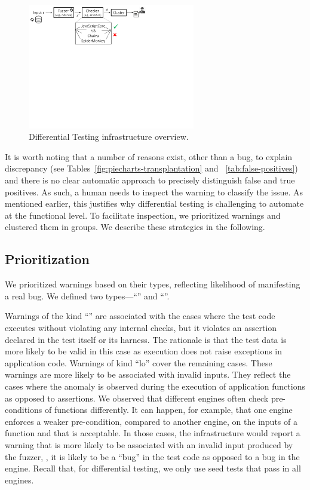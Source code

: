 \documentclass[sigconf,review, anonymous]{acmart}
\begin{document}
\begin{figure}[t]
  \centering
  \includegraphics[trim=0 350 0 0,clip,width=0.65\textwidth]{diff-testing-runtimes}
  \caption{\label{fig:workflow}Differential Testing infrastructure overview.}
\end{figure}


It is worth noting that a number of reasons exist, other than a bug,
to explain discrepancy (see Tables~\ref{fig:piecharts-transplantation}
and ~\ref{tab:false-positives}) and there is no clear automatic
approach to precisely distinguish false and true positives. As such, a
human needs to inspect the warning to classify the issue. As mentioned
earlier, this justifies why differential testing is challenging to
automate at the functional level. To facilitate inspection, we
prioritized warnings and clustered them in groups. We describe these
strategies in the following.

\subsection{Prioritization}

We prioritized warnings based on their types, reflecting likelihood of
manifesting a real bug. We defined two types---``\hi{}'' and
``\lo{}''.

Warnings of the kind ``\hi{}'' are associated with the cases where the
test code executes without violating any internal checks, but it
violates an assertion declared in the test itself or its harness. The
rationale is that the test data is more likely to be valid in this
case as execution does not raise exceptions in application
code. Warnings of kind ``lo'' cover the remaining cases. These
warnings are more likely to be associated with invalid inputs. They
reflect the cases where the anomaly is observed during the execution
of application functions as opposed to assertions. We observed that
different engines often check pre-conditions of functions
differently. It can happen, for example, that one engine enforces a
weaker pre-condition, compared to another engine, on the inputs of a
function and that is acceptable. In those cases,
the infrastructure would report a warning that is more likely to be
associated with an invalid input produced by the fuzzer, \ie{}, it is
likely to be a ``bug'' in the test code as opposed to a bug in the
engine. Recall that, for differential testing, we only use seed tests
that pass in all engines.
\end{document}
